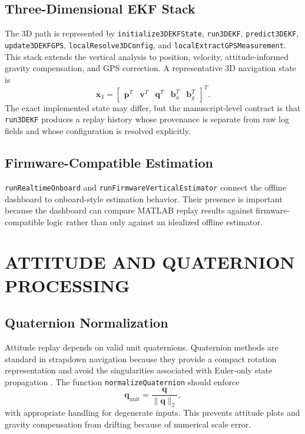 \documentclass[colorlinks,upint,subscriptcorrection,varvw,hyphenate,balance]{asmeconf}
\newcommand{\code}[1]{\texttt{\allowbreak#1}}
\newcommand{\q}{\mathbf{q}}
\newcommand{\x}{\mathbf{x}}
\newcommand{\vvec}{\mathbf{v}}
\newcommand{\pvec}{\mathbf{p}}
\begin{document}
\subsection{Three-Dimensional EKF Stack}
The 3D path is represented by \code{initialize3DEKFState}, \code{run3DEKF}, \code{predict3DEKF}, \code{update3DEKFGPS}, \code{localResolve3DConfig}, and \code{localExtractGPSMeasurement}. This stack extends the vertical analysis to position, velocity, attitude-informed gravity compensation, and GPS correction. A representative 3D navigation state is
\begin{equation}
\x_3 =
\begin{bmatrix}
\pvec^T & \vvec^T & \q^T & \mathbf{b}_a^T & \mathbf{b}_g^T
\end{bmatrix}^T.
\label{eq:state_3d}
\end{equation}
The exact implemented state may differ, but the manuscript-level contract is that \code{run3DEKF} produces a replay history whose provenance is separate from raw log fields and whose configuration is resolved explicitly.

\subsection{Firmware-Compatible Estimation}
\code{runRealtimeOnboard} and \code{runFirmwareVerticalEstimator} connect the offline dashboard to onboard-style estimation behavior. Their presence is important because the dashboard can compare MATLAB replay results against firmware-compatible logic rather than only against an idealized offline estimator.

\section{ATTITUDE AND QUATERNION PROCESSING}

\subsection{Quaternion Normalization}
Attitude replay depends on valid unit quaternions. Quaternion methods are standard in strapdown navigation because they provide a compact rotation representation and avoid the singularities associated with Euler-only state propagation \cite{titterton,kuipers}. The function \code{normalizeQuaternion} should enforce
\begin{equation}
\q_{\mathrm{unit}} = \frac{\q}{\lVert\q\rVert_2},
\label{eq:quat_norm}
\end{equation}
with appropriate handling for degenerate inputs. This prevents attitude plots and gravity compensation from drifting because of numerical scale error.
\end{document}
